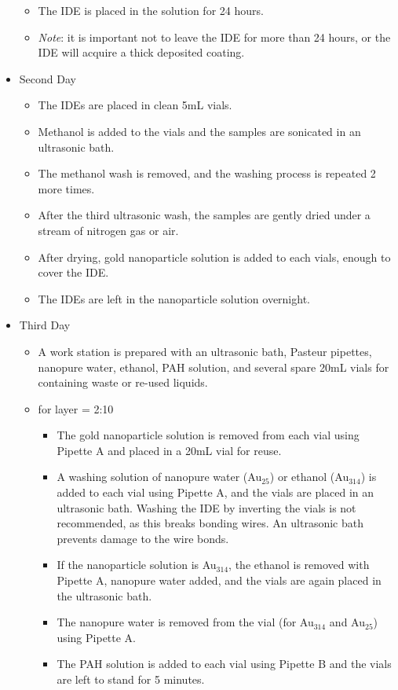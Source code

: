 \documentclass[12pt,oneside,english]{article}
\begin{document}
\begin{itemize}
\begin{itemize}
			\item The IDE is placed in the solution for 24 hours.
			\item \emph{Note}: it is important not to leave the IDE for more than 24 hours, or the IDE will acquire a thick deposited coating.
		\end{itemize}
		\item Second Day
		\begin{itemize}
			\item The IDEs are placed in clean 5mL vials.
			\item Methanol is added to the vials and the samples are sonicated in an ultrasonic bath.
			\item The methanol wash is removed, and the washing process is repeated 2 more times.
			\item After the third ultrasonic wash, the samples are gently dried under a stream of nitrogen gas or air.
			\item After drying, gold nanoparticle solution is added to each vials, enough to cover the IDE.
			\item The IDEs are left in the nanoparticle solution overnight.
		\end{itemize}
		\item Third Day
		\begin{itemize}
			\item A work station is prepared with an ultrasonic bath, Pasteur pipettes, nanopure water, ethanol, PAH solution, and several spare 20mL vials for containing waste or re-used liquids.
			\item for layer = 2:10 
			\begin{itemize}
				\item The gold nanoparticle solution is removed from each vial using Pipette A and placed in a 20mL vial for reuse.
				\item A washing solution of nanopure water (Au$_{25}$) or ethanol (Au$_{314}$) is added to each vial using Pipette A, and the vials are placed in an ultrasonic bath.
					\subitem Washing the IDE by inverting the vials is not recommended, as this breaks bonding wires.  An ultrasonic bath prevents damage to the wire bonds.
				\item If the nanoparticle solution is Au$_{314}$, the ethanol is removed with Pipette A, nanopure water added, and the vials are again placed in the ultrasonic bath.
				\item The nanopure water is removed from the vial (for Au$_{314}$ and Au$_{25}$) using Pipette A.
				\item The PAH solution is added to each vial using Pipette B and the vials are left to stand for 5 minutes.

\end{itemize}
\end{itemize}
\end{itemize}
\end{document}
